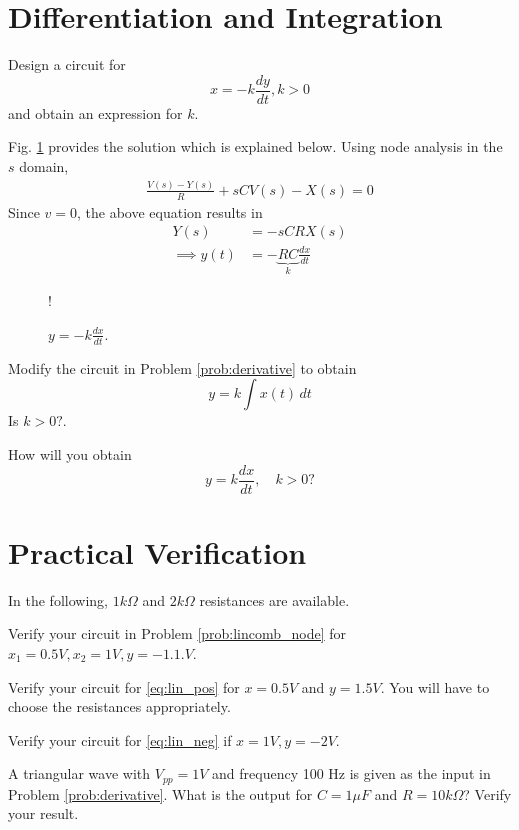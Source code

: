 \documentclass[journal,12pt,twocolumn]{IEEEtran}
\begin{document}
\section{Differentiation and Integration}
\begin{problem}
\label{prob:derivative}
Design a circuit for 
\begin{equation}
x = -k\frac{dy}{dt},  k > 0
\end{equation}
and obtain an expression for $k$.
\end{problem}
\solution
Fig. \ref{fig:derivative} provides the solution which is explained below. Using node analysis in the $s$ domain,
\begin{align}
\frac{V(s)- Y(s)}{R} + sC{V(s)-X(s)} = 0
\end{align}
%
Since $v = 0$, the above equation results in
\begin{align}
Y(s) &= -sCR X(s)
\\
\implies y(t) &= -\underbrace{RC}_{k} \frac{dx}{dt}
\end{align}
\begin{figure}[!h]
\centering
\resizebox {\columnwidth} {!} {

}
\caption{$y = -k\frac{dx}{dt}$.}
\label{fig:derivative}
\end{figure}
%
\begin{problem}
Modify the circuit in Problem \ref{prob:derivative} to obtain
%
\begin{equation}
y = k\int x(t)\,dt
\end{equation}
%
Is $k > 0?$.
\end{problem}
\begin{problem}
How will you obtain 
%
\begin{equation}
y = k \frac{dx}{dt}, \quad k > 0 ?
\end{equation}
%
\end{problem}
\section{Practical Verification}
In the following, $1k\Omega$ and $2k\Omega$ resistances are available.
\begin{problem}
Verify your circuit in Problem \ref{prob:lincomb_node} for $x_1 = 0.5 V, x_2 = 1 V, y = -1.1. V $.
\end{problem}
\begin{problem}
Verify  your circuit for \eqref{eq:lin_pos} for  $x = 0.5 V$ and $y = 1.5 V$. You will have to choose the resistances appropriately.
\end{problem}
\begin{problem}
Verify your circuit for \eqref{eq:lin_neg} if $x = 1 V, y = -2 V$.
\end{problem}
\begin{problem}
A triangular wave with $V_{pp} = 1V$ and frequency  100 Hz is given as the input in Problem \ref{prob:derivative}.  What is the output for $C = 1 \mu F$ and $R = 10 k\Omega$? Verify your
result.
\end{problem}
\end{document}

